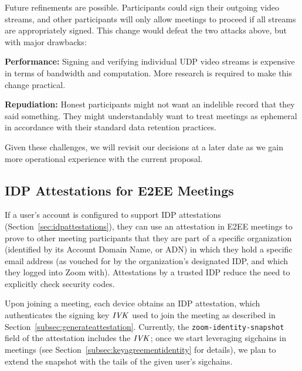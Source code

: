Future refinements are possible. Participants could sign their outgoing video streams, and other
participants will only allow meetings to proceed if all streams are appropriately signed. This
change would defeat the two attacks above, but with major drawbacks:
%
\begin{description}
    \item {\bf Performance:} Signing and verifying individual UDP video streams is expensive in
    terms of bandwidth and computation. More research is required to make this change practical.
    \item {\bf Repudiation:} Honest participants might not want an indelible record that they said
    something. They might understandably want to treat meetings as ephemeral in accordance with
    their standard data retention practices.
\end{description}

Given these challenges, we will revisit our decisions at a later date as we gain more operational
experience with the current proposal.

\subsection{IDP Attestations for E2EE Meetings}
\label{subsec:idpattestationmeetings}

If a user's account is configured to support IDP attestations
(Section~\ref{sec:idpattestations}), they can use an attestation in E2EE
meetings to prove to other meeting participants that they are part of a specific
organization (identified by its Account Domain Name, or ADN) in which they hold a specific email address
(as vouched for by the organization's designated IDP, and which they logged into
Zoom with). Attestations by a trusted IDP reduce the need to explicitly check security codes.

Upon joining a meeting, each device obtains an IDP attestation, which
authenticates the signing key $\mathit{IVK}$ used to join the meeting as described in
Section~\ref{subsec:generateattestation}. Currently, the \texttt{zoom-identity-snapshot} field of the attestation
includes the $\mathit{IVK}$; once we start leveraging sigchains in meetings (see
Section~\ref{subsec:keyagreementidentity} for details),  we plan to extend the
snapshot with the tails of the given user's sigchains. 

